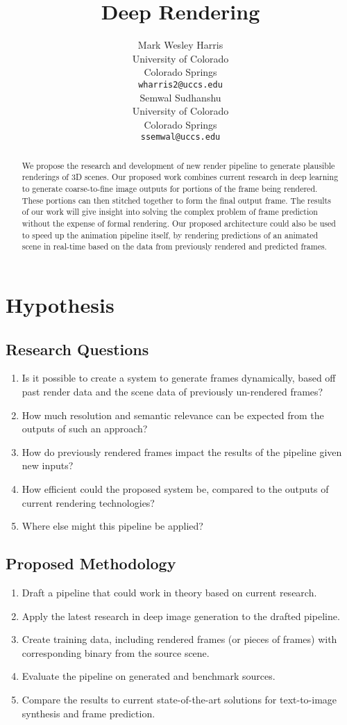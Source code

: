\documentclass{article}
\title{Deep Rendering}
\author{Mark Wesley Harris\\
University of Colorado\\
Colorado Springs\\
\texttt{wharris2@uccs.edu} \\
\And
Semwal Sudhanshu\\
University of Colorado\\
Colorado Springs\\
\texttt{ssemwal@uccs.edu} \\
}
\begin{document}
\maketitle

\begin{abstract}
We propose the research and development of new render pipeline
to generate plausible renderings of 3D scenes.
Our proposed work combines current research in deep learning to generate
coarse-to-fine image outputs for portions of the frame being rendered.
These portions can then stitched together to form the final output frame.
The results of our work will give insight into solving the complex problem of
frame prediction without the expense of formal rendering.
Our proposed architecture could also be used to speed up
the animation pipeline itself, by rendering predictions of an animated
scene in real-time based on the data from previously rendered and predicted
frames.
\end{abstract}

\section{Hypothesis}
\label{sec:hypothesis}

\subsection{Research Questions}
\label{subsec:questions}
\begin{enumerate}
\item Is it possible to create a system to generate frames dynamically, based off
past render data and the scene data of previously un-rendered frames?
\item How much resolution and semantic relevance can be expected from the outputs
of such an approach?
\item How do previously rendered frames impact the results of the pipeline given
new inputs?
\item How efficient could the proposed system be, compared to the outputs of
current rendering technologies?
\item Where else might this pipeline be applied?
\end{enumerate}

\subsection{Proposed Methodology}
\label{sec:methodology}
\begin{enumerate}
\item Draft a pipeline that could work in theory based on current research.
\item Apply the latest research in deep image generation to the drafted pipeline.
\item Create training data, including rendered frames (or pieces of frames) with
corresponding binary from the source scene.
\item Evaluate the pipeline on generated and benchmark sources.
\item Compare the results to current state-of-the-art solutions for text-to-image
synthesis and frame prediction.
\end{enumerate}
\end{document}
